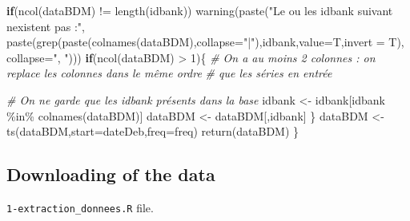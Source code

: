 \documentclass[
  10pt,
]{article}
\newenvironment{Shaded}{\begin{snugshade}}{\end{snugshade}}
\newcommand{\AttributeTok}[1]{\textcolor[rgb]{0.77,0.63,0.00}{#1}}
\newcommand{\CommentTok}[1]{\textcolor[rgb]{0.56,0.35,0.01}{\textit{#1}}}
\newcommand{\ControlFlowTok}[1]{\textcolor[rgb]{0.13,0.29,0.53}{\textbf{#1}}}
\newcommand{\DecValTok}[1]{\textcolor[rgb]{0.00,0.00,0.81}{#1}}
\newcommand{\FunctionTok}[1]{\textcolor[rgb]{0.00,0.00,0.00}{#1}}
\newcommand{\NormalTok}[1]{#1}
\newcommand{\OtherTok}[1]{\textcolor[rgb]{0.56,0.35,0.01}{#1}}
\newcommand{\SpecialCharTok}[1]{\textcolor[rgb]{0.00,0.00,0.00}{#1}}
\newcommand{\StringTok}[1]{\textcolor[rgb]{0.31,0.60,0.02}{#1}}
\begin{document}
\begin{Shaded}
\begin{Highlighting}[]
    \ControlFlowTok{if}\NormalTok{(}\FunctionTok{ncol}\NormalTok{(dataBDM) }\SpecialCharTok{!=} \FunctionTok{length}\NormalTok{(idbank))}
        \FunctionTok{warning}\NormalTok{(}\FunctionTok{paste}\NormalTok{(}\StringTok{"Le ou les idbank suivant n\textquotesingle{}existent pas :"}\NormalTok{,}
                      \FunctionTok{paste}\NormalTok{(}\FunctionTok{grep}\NormalTok{(}\FunctionTok{paste}\NormalTok{(}\FunctionTok{colnames}\NormalTok{(dataBDM),}\AttributeTok{collapse=}\StringTok{"|"}\NormalTok{),idbank,}\AttributeTok{value=}\NormalTok{T,}\AttributeTok{invert =}\NormalTok{ T),}
                            \AttributeTok{collapse=}\StringTok{", "}\NormalTok{)))}
    \ControlFlowTok{if}\NormalTok{(}\FunctionTok{ncol}\NormalTok{(dataBDM) }\SpecialCharTok{\textgreater{}} \DecValTok{1}\NormalTok{)\{}
        \CommentTok{\# On a au moins 2 colonnes : on replace les colonnes dans le même ordre }
        \CommentTok{\# que les séries en entrée}
        
        \CommentTok{\# On ne garde que les idbank présents dans la base}
\NormalTok{        idbank }\OtherTok{\textless{}{-}}\NormalTok{ idbank[idbank }\SpecialCharTok{\%in\%} \FunctionTok{colnames}\NormalTok{(dataBDM)]}
\NormalTok{        dataBDM }\OtherTok{\textless{}{-}}\NormalTok{ dataBDM[,idbank]}
\NormalTok{    \}}
\NormalTok{    dataBDM }\OtherTok{\textless{}{-}} \FunctionTok{ts}\NormalTok{(dataBDM,}\AttributeTok{start=}\NormalTok{dateDeb,}\AttributeTok{freq=}\NormalTok{freq)}
    \FunctionTok{return}\NormalTok{(dataBDM)}
\NormalTok{\}}
\end{Highlighting}
\end{Shaded}

\hypertarget{downloading-of-the-data}{%
\subsection{Downloading of the data}\label{downloading-of-the-data}}

\texttt{1-extraction\_donnees.R} file.
\end{document}
